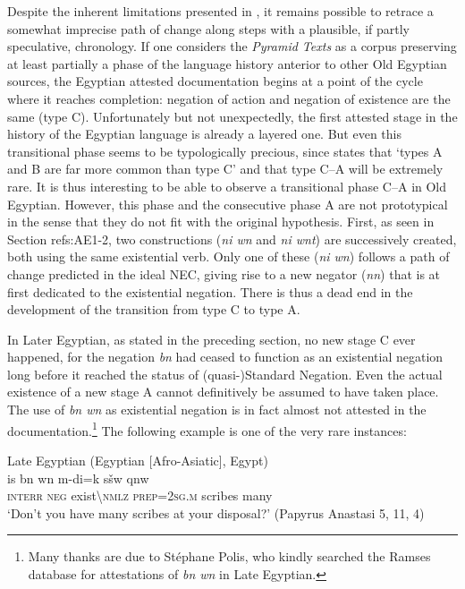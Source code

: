 \documentclass[output=paper]{langsci/langscibook}
\newcommand{\ꜥ}{ʿ}
\newcommand{\ꜣ}{\kern-.25pt\texttt{ꜣ}\kern-.6pt}
\begin{document}
Despite the inherent limitations presented in , it remains possible to retrace a somewhat imprecise path of change along steps with a plausible, if partly speculative, chronology. If one considers the \emph{Pyramid Texts} as a corpus preserving at least partially a phase of the language history anterior to other Old Egyptian sources, the Egyptian attested documentation begins at a point of the cycle where it reaches completion: negation of action and negation of existence are the same (type C). Unfortunately but not unexpectedly, the first attested stage in the history of the Egyptian language is already a layered one. But even this transitional phase seems to be typologically precious, since \citet[18]{Croft1991} states that ‘types A and B are far more common than type C’ and that type C–A will be extremely rare. It is thus interesting to be able to observe a transitional phase C–A in Old Egyptian. However, this phase and the consecutive phase A are not prototypical in the sense that they do not fit with the original hypothesis. First, as seen in Section ref{s:AE1-2}, two constructions (\textit{ni wn} and \textit{ni wnt}) are successively created, both using the same existential verb. Only one of these (\textit{ni wn}) follows a path of change predicted in the ideal NEC, giving rise to a new negator (\textit{nn}) that is at first dedicated to the existential negation. There is thus a dead end in the development of the transition from type C to type A.
 
In Later Egyptian, as stated in the preceding section, no new stage C ever happened, for the negation \textit{bn} had ceased to function as an existential negation long before it reached the status of (quasi-)Standard Negation. Even the actual existence of a new stage A cannot definitively be assumed to have taken place. The use of \textit{bn wn} as existential negation is in fact almost not attested in the documentation.\footnote{Many thanks are due to Stéphane Polis, who kindly searched the Ramses database for attestations of \textit{bn wn} in Late Egyptian.} 
The following example is one of the very rare instances:

\ea Late Egyptian (Egyptian [Afro-Asiatic], Egypt) \label{ex:AE51}\\
    \gll is bn wn m-di=k sšw qnw\\
    \textsc{interr} \textsc{neg} exist\textbackslash\textsc{nmlz} \textsc{prep=2sg.m} scribes many\\ 
    \glt ‘Don’t you have many scribes at your disposal?’ (Papyrus Anastasi 5, 11, 4)
\z 
\end{document}
